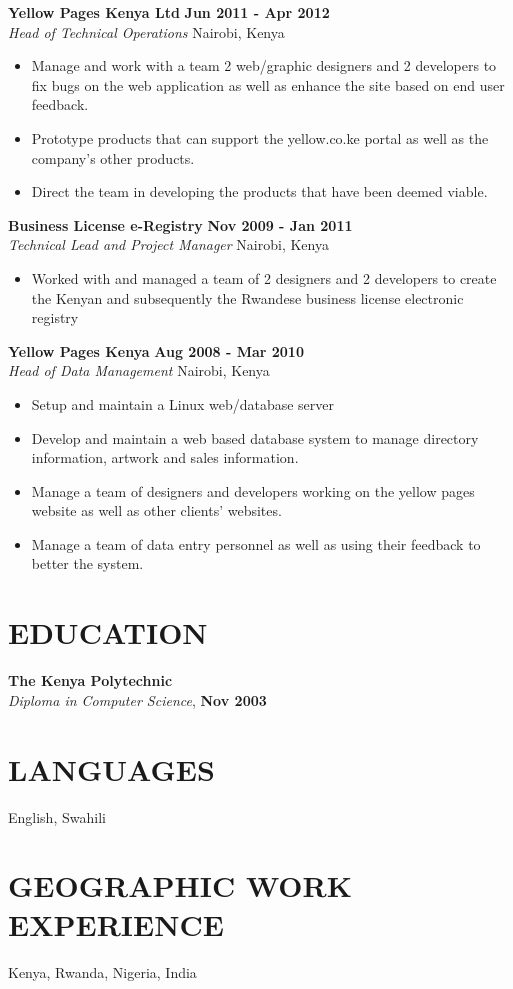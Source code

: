 \documentclass{res}
\begin{document}
\begin{resume}
\textbf{Yellow Pages Kenya Ltd} \hfill        \textbf{Jun 2011 - Apr 2012} \\
\emph{Head of Technical Operations}       \hfill   Nairobi, Kenya
   \begin{itemize} \itemsep -2pt %
	\item Manage and work with a team 2 web/graphic designers and 2 developers to fix bugs on the web application as well as enhance the site based on end user feedback.
	\item Prototype products that can support the yellow.co.ke portal as well as the company’s other products.
	\item Direct the team in developing the products that have been deemed viable.
 \end{itemize} \vspace{-4pt}

\textbf{Business License e-Registry} \hfill \textbf{Nov 2009 - Jan 2011} \\
\emph{Technical Lead and Project Manager} \hfill Nairobi, Kenya
 \begin{itemize} \itemsep -2pt
  \item  Worked with and managed a team of 2 designers and 2 developers to create the Kenyan and subsequently the Rwandese business license 
  electronic registry
\end{itemize} \vspace{-6pt}

\textbf{Yellow Pages Kenya} \hfill \textbf{Aug 2008 - Mar 2010} \\
\emph{Head of Data Management} \hfill Nairobi, Kenya
 \begin{itemize} \itemsep -2pt
  \item  Setup and maintain a Linux web/database server
  \item Develop and maintain a web based database system to manage directory information,
artwork and sales information.
\item Manage a team of designers and developers working on the yellow pages website as well
as other clients’ websites.
\item Manage a team of data entry personnel as well as using their feedback to better the system.
 \end{itemize} \vspace{-6pt}

\section{EDUCATION} 
\vspace{8pt} 
\textbf{The Kenya Polytechnic}  \\
\emph{Diploma in Computer Science}, \hfill \textbf{Nov 2003}

\section{LANGUAGES} 
\vspace{8pt}
English, Swahili

\section{GEOGRAPHIC WORK EXPERIENCE} 
\vspace{8pt}
Kenya, Rwanda, Nigeria, India

\end{resume} 
\end{document}
